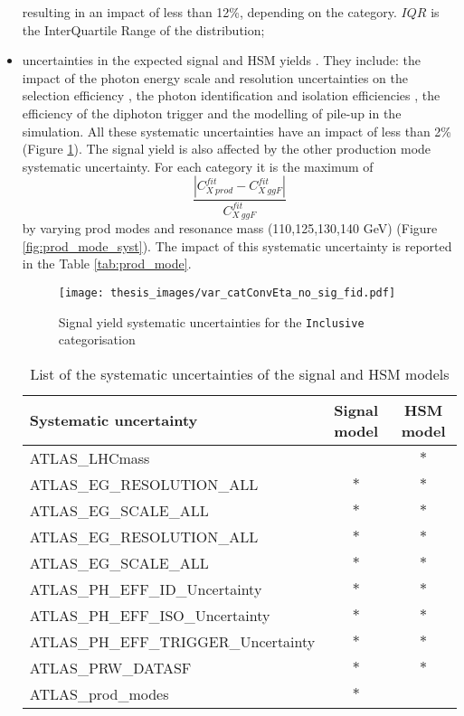 \documentclass[a4paper, oneside, 11pt, openright]{book}
\begin{document}
\begin{itemize}
 					resulting in an impact of less than 12\%, depending on the category. $IQR$ is the InterQuartile Range of the distribution;
 					\item uncertainties in the expected signal and HSM yields . They include: the impact of the photon energy scale and resolution uncertainties on the selection efficiency \cite{Aad_2019}, the photon identification and isolation efficiencies \cite{Aad_2019}, the efficiency of the diphoton trigger \cite{e_trigger} and the modelling of pile-up in the simulation. All these systematic uncertainties have an impact  of less than 2\% (Figure \ref{fig:yield_syst}). The signal yield is also affected by  the other production mode systematic uncertainty. For each category it is the maximum of  $$\dfrac{|C^{fit}_{X\ prod}-C^{fit}_{X\ ggF}|}{C^{fit}_{X\ ggF}}$$ by varying prod modes and resonance mass (110,125,130,140 GeV) (Figure \ref{fig:prod_mode_syst}). The impact of this systematic uncertainty is reported in the Table \ref{tab:prod_mode}.
 					\begin{figure}
 						\centering
 						\texttt{[image: thesis\_images/var\_catConvEta\_no\_sig\_fid.pdf]}
 						\caption{Signal yield systematic uncertainties for the \texttt{Inclusive} categorisation}
 						\label{fig:yield_syst}
 					\end{figure}
 					\begin{center}
 						\begin{table}[tbp]
 							\centering
 							\begin{tabular}{lcc}
 								\toprule[1.5pt]
 								Systematic uncertainty					& Signal model	& HSM model	\\
 								\midrule
 								ATLAS\_LHCmass							& 				& $\ast$	\\
 								ATLAS\_EG\_RESOLUTION\_ALL				& $\ast$		& $\ast$	\\
 								ATLAS\_EG\_SCALE\_ALL					& $\ast$		& $\ast$	\\
 								\midrule
 								ATLAS\_EG\_RESOLUTION\_ALL				& $\ast$		& $\ast$	\\
 								ATLAS\_EG\_SCALE\_ALL					& $\ast$		& $\ast$	\\
 								ATLAS\_PH\_EFF\_ID\_Uncertainty			& $\ast$		& $\ast$	\\
 								ATLAS\_PH\_EFF\_ISO\_Uncertainty		& $\ast$		& $\ast$	\\
 								ATLAS\_PH\_EFF\_TRIGGER\_Uncertainty	& $\ast$		& $\ast$	\\
 								ATLAS\_PRW\_DATASF						& $\ast$		& $\ast$	\\
 								ATLAS\_prod\_modes						& $\ast$		& 			\\
 								\bottomrule[1.5pt]
 							\end{tabular}
 							\caption{List of the systematic uncertainties of the signal and HSM models}
 						\end{table}
 					\end{center}
 				

\end{itemize}
\end{document}
